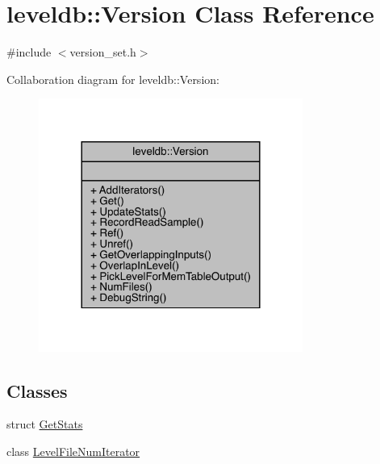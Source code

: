 \hypertarget{classleveldb_1_1_version}{}\section{leveldb\+::Version Class Reference}
\label{classleveldb_1_1_version}


{\ttfamily \#include $<$version\+\_\+set.\+h$>$}



Collaboration diagram for leveldb\+::Version\+:
\nopagebreak
\begin{figure}[H]
\begin{center}
\leavevmode
\includegraphics[width=245pt]{classleveldb_1_1_version__coll__graph}
\end{center}
\end{figure}
\subsection*{Classes}
\begin{DoxyCompactItemize}
\item 
struct \mbox{\hyperlink{structleveldb_1_1_version_1_1_get_stats}{Get\+Stats}}
\item 
class \mbox{\hyperlink{classleveldb_1_1_version_1_1_level_file_num_iterator}{Level\+File\+Num\+Iterator}}
\end{DoxyCompactItemize}

